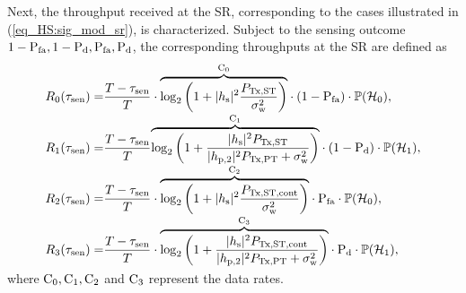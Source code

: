 Next, the throughput received at the SR, corresponding to the cases illustrated in (\ref{eq_HS:sig_mod_sr}), is characterized. Subject to the sensing outcome $1 - \pfa, 1 - \pd, \pfa, \pd$, the corresponding throughputs at the SR are defined as 
\begin{align}
\rsz(\tsen) =& \frac{T- \tsen}{T} \cdot \smash[b]{\overbrace{\log_2 \left(1 + |\hs|^2 \frac{\pfull}{\npo}\right)}^{\cz}} \cdot (1 - \pfa ) \cdot \phz,  \label{eq_HS:Cap0} \\ 
\rso(\tsen) =& \frac{T- \tsen}{T} \smash[b]{\overbrace{\log_2 \left(1 + \frac{|\hs|^2 \pfull }{|\hptw|^2 \ptranpt  + \npo} \right)}^{\co}} \cdot (1 - \pd) \cdot \pho,  \label{eq_HS:Cap1} \\ 
\rstw(\tsen) =& \frac{T- \tsen}{T} \cdot \smash[b]{\overbrace{\log_2 \left(1 + |\hs|^2 \frac{\preg}{\npo}\right)}^{\ctw}}  \cdot \pfa \cdot \phz,  \label{eq_HS:Cap2} \\ 
\rsth(\tsen) =& \frac{T- \tsen}{T} \cdot \smash[b]{\overbrace{\log_2 \left(1 + \frac{|\hs|^2 \preg }{|\hptw|^2 \ptranpt  + \npo} \right)}^{\cth}} \cdot \pd \cdot \pho,  \label{eq_HS:Cap3}  
\end{align}
where $\cz, \co, \ctw$ and $\cth$ represent the data rates.

